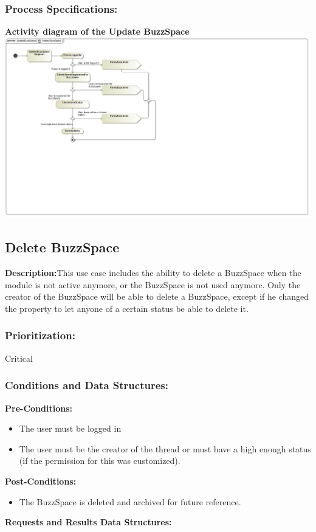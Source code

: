 \documentclass[a4paper,11pt]{article}
\begin{document}
\subsubsection{Process Specifications:} 
\textbf{Activity diagram of the Update BuzzSpace}\\ 
\includegraphics[width=1\linewidth]{./Images/BuzzSpaceHandling/buzzSpaceUpdateAct.jpg}\\

\subsection{Delete BuzzSpace}
\textbf{Description:}This use case includes the ability to delete a BuzzSpace when the module is not active anymore, or the BuzzSpace is not used anymore. Only the creator of the 
BuzzSpace will be able to delete a BuzzSpace, except if he changed the property to let anyone of a certain status be able to delete it.
\subsubsection{Prioritization:} Critical
\subsubsection{Conditions and Data Structures:}
\textbf{Pre-Conditions:}
\begin{itemize}
	\item The user must be logged in
	\item The user must be the creator of the thread or must have a high enough status (if the permission for this was customized).
\end{itemize}
\textbf{Post-Conditions:}
\begin{itemize}
	\item The BuzzSpace is deleted and archived for future reference. 
\end{itemize}
\textbf{Requests and Results Data Structures:}
\end{document}
